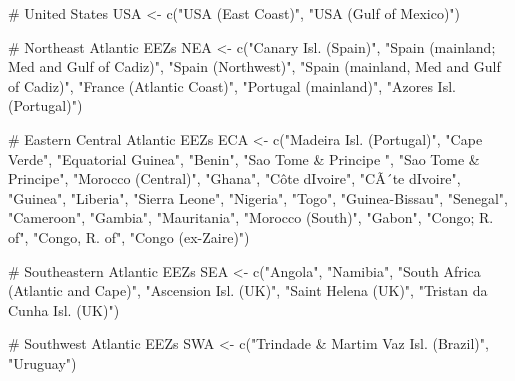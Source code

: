 \documentclass[
]{article}
\newenvironment{Shaded}{\begin{snugshade}}{\end{snugshade}}
\newcommand{\CommentTok}[1]{\textcolor[rgb]{0.37,0.37,0.37}{#1}}
\newcommand{\FunctionTok}[1]{\textcolor[rgb]{0.28,0.35,0.67}{#1}}
\newcommand{\NormalTok}[1]{\textcolor[rgb]{0.00,0.23,0.31}{#1}}
\newcommand{\OtherTok}[1]{\textcolor[rgb]{0.00,0.23,0.31}{#1}}
\newcommand{\StringTok}[1]{\textcolor[rgb]{0.13,0.47,0.30}{#1}}
\begin{document}
\begin{Shaded}
\begin{Highlighting}[]
\CommentTok{\# United States}
\NormalTok{USA }\OtherTok{\textless{}{-}}  \FunctionTok{c}\NormalTok{(}\StringTok{"USA (East Coast)"}\NormalTok{, }\StringTok{"USA (Gulf of Mexico)"}\NormalTok{)}
           
\CommentTok{\# Northeast Atlantic EEZs}
\NormalTok{NEA }\OtherTok{\textless{}{-}} \FunctionTok{c}\NormalTok{(}\StringTok{"Canary Isl. (Spain)"}\NormalTok{, }\StringTok{"Spain (mainland; Med and Gulf of Cadiz)"}\NormalTok{, }\StringTok{"Spain (Northwest)"}\NormalTok{, }
         \StringTok{"Spain (mainland, Med and Gulf of Cadiz)"}\NormalTok{, }
         \StringTok{"France (Atlantic Coast)"}\NormalTok{, }\StringTok{"Portugal (mainland)"}\NormalTok{, }\StringTok{"Azores Isl. (Portugal)"}\NormalTok{)}
        
\CommentTok{\# Eastern Central Atlantic EEZs}
\NormalTok{ECA }\OtherTok{\textless{}{-}} \FunctionTok{c}\NormalTok{(}\StringTok{"Madeira Isl. (Portugal)"}\NormalTok{, }\StringTok{"Cape Verde"}\NormalTok{, }\StringTok{"Equatorial Guinea"}\NormalTok{, }\StringTok{"Benin"}\NormalTok{, }
          \StringTok{"Sao Tome \& Principe "}\NormalTok{, }\StringTok{"Sao Tome \& Principe"}\NormalTok{, }\StringTok{"Morocco (Central)"}\NormalTok{, }\StringTok{"Ghana"}\NormalTok{, }
          \StringTok{"Côte d\textquotesingle{}Ivoire"}\NormalTok{, }\StringTok{"CÃ´te d\textquotesingle{}Ivoire"}\NormalTok{, }\StringTok{"Guinea"}\NormalTok{, }\StringTok{"Liberia"}\NormalTok{, }\StringTok{"Sierra Leone"}\NormalTok{, }\StringTok{"Nigeria"}\NormalTok{, }\StringTok{"Togo"}\NormalTok{, }
          \StringTok{"Guinea{-}Bissau"}\NormalTok{, }\StringTok{"Senegal"}\NormalTok{, }\StringTok{"Cameroon"}\NormalTok{, }\StringTok{"Gambia"}\NormalTok{, }\StringTok{"Mauritania"}\NormalTok{, }\StringTok{"Morocco (South)"}\NormalTok{, }
          \StringTok{"Gabon"}\NormalTok{, }\StringTok{"Congo; R. of"}\NormalTok{, }\StringTok{"Congo, R. of"}\NormalTok{, }\StringTok{"Congo (ex{-}Zaire)"}\NormalTok{)}

\CommentTok{\# Southeastern Atlantic EEZs}
\NormalTok{SEA }\OtherTok{\textless{}{-}} \FunctionTok{c}\NormalTok{(}\StringTok{"Angola"}\NormalTok{, }\StringTok{"Namibia"}\NormalTok{, }\StringTok{"South Africa (Atlantic and Cape)"}\NormalTok{,  }
           \StringTok{"Ascension Isl. (UK)"}\NormalTok{, }\StringTok{"Saint Helena (UK)"}\NormalTok{, }\StringTok{"Tristan da Cunha Isl. (UK)"}\NormalTok{)}

\CommentTok{\# Southwest Atlantic EEZs}
\NormalTok{SWA }\OtherTok{\textless{}{-}} \FunctionTok{c}\NormalTok{(}\StringTok{"Trindade \& Martim Vaz Isl. (Brazil)"}\NormalTok{, }\StringTok{"Uruguay"}\NormalTok{)}


\end{Highlighting}
\end{Shaded}
\end{document}
